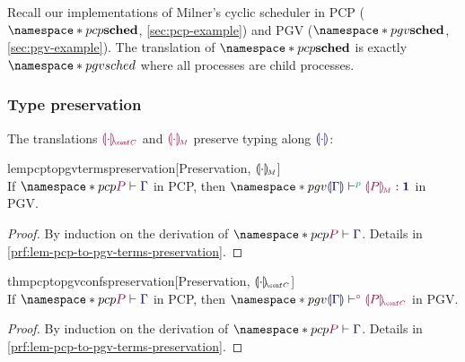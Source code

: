 \documentclass[main.tex]{subfiles}
\begin{document}
Recall our implementations of Milner's cyclic scheduler in PCP ($\pcp{\sched}$, \cref{sec:pcp-example}) and PGV ($\pgv{\sched}$, \cref{sec:pgv-example}). The translation of $\pcp{\sched}$ is exactly $\pgv{sched}$ where all processes are child processes.

\subsubsection*{Type preservation}
The translations $\tm{\cpgvC{\cdot}}$ and $\tm{\cpgvM{\cdot}}$ preserve typing along $\ty{\cpgvT{\cdot}}$:
\begin{restatablelemma}{lempcptopgvtermspreservation}[Preservation, $\llparenthesis\cdot\rrparenthesis_{\!\scriptscriptstyle{M}}$]
  \label{lem:pcp-to-pgv-terms-preservation}
  \hfill\\%
  If $\pcp{\seq{P}{\ty{\Gamma}}}$ in PCP,
  then $\pgv{\tseq[\cs{p}]{\ty{\cpgvT{\Gamma}}}{\cpgvM{P}}{\tyunit}}$ in PGV.
\end{restatablelemma}
\begin{proof}
  By induction on the derivation of $\pcp{\seq{P}{\ty{\Gamma}}}$.
  Details in \cref{prf:lem-pcp-to-pgv-terms-preservation}.
\end{proof}
\begin{restatabletheorem}{thmpcptopgvconfspreservation}[Preservation, $\cpgvC{\cdot}$]
  \label{thm:pcp-to-pgv-confs-preservation}
  \hfill\\%
  If $\pcp{\seq{P}{\ty{\Gamma}}}$ in PCP,
  then $\pgv{\cseq[\child]{\ty{\cpgvT{\Gamma}}}{\cpgvC{P}}}$ in PGV.
\end{restatabletheorem}
\begin{proof}
  By induction on the derivation of $\pcp{\seq{P}{\ty{\Gamma}}}$.
  Details in \cref{prf:lem-pcp-to-pgv-terms-preservation}.
\end{proof}
\end{document}

